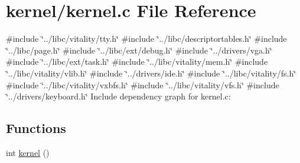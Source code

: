 \hypertarget{a00047}{}\section{kernel/kernel.c File Reference}
\label{a00047}
{\ttfamily \#include \char`\"{}../libc/vitality/tty.\+h\char`\"{}}\newline
{\ttfamily \#include \char`\"{}../libc/descriptortables.\+h\char`\"{}}\newline
{\ttfamily \#include \char`\"{}../libc/page.\+h\char`\"{}}\newline
{\ttfamily \#include \char`\"{}../libc/ext/debug.\+h\char`\"{}}\newline
{\ttfamily \#include \char`\"{}../drivers/vga.\+h\char`\"{}}\newline
{\ttfamily \#include \char`\"{}../libc/ext/task.\+h\char`\"{}}\newline
{\ttfamily \#include \char`\"{}../libc/vitality/mem.\+h\char`\"{}}\newline
{\ttfamily \#include \char`\"{}../libc/vitality/vlib.\+h\char`\"{}}\newline
{\ttfamily \#include \char`\"{}../drivers/ide.\+h\char`\"{}}\newline
{\ttfamily \#include \char`\"{}../libc/vitality/fs.\+h\char`\"{}}\newline
{\ttfamily \#include \char`\"{}../libc/vitality/vxbfs.\+h\char`\"{}}\newline
{\ttfamily \#include \char`\"{}../libc/vitality/vfs.\+h\char`\"{}}\newline
{\ttfamily \#include \char`\"{}../drivers/keyboard.\+h\char`\"{}}\newline
Include dependency graph for kernel.\+c\+:
\subsection*{Functions}
\begin{DoxyCompactItemize}
\item 
int \hyperlink{a00047_a4ee3d1f05046b7afc6b4d516bf10667a_a4ee3d1f05046b7afc6b4d516bf10667a}{kernel} ()
\end{DoxyCompactItemize}
